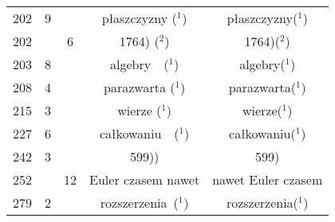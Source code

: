 \documentclass[a4paper,11pt]{article}
\numberwithin{equation}{section}
\begin{document}
\begin{center}
\begin{tabular}{|c|c|c|c|c|}
    202 & \hphantom{0}9 & & płaszczyzny ($^{ 1 }$) & płaszczyzny($^{ 1 }$) \\
    202 & & \hphantom{0}6 & 1764) ($^{ 2 }$) & 1764)($^{ 2 }$) \\
    203 & \hphantom{0}8 & & algebry~~($^{ 1 }$) & algebry($^{ 1 }$) \\
    208 & \hphantom{0}4 & & parazwarta ($^{ 1 }$) & parazwarta($^{ 1 }$) \\
    215 & \hphantom{0}3 & & wierze ($^{ 1 }$) & wierze($^{ 1 }$) \\
    227 & \hphantom{0}6 & & całkowaniu~~($^{ 1 }$) & całkowaniu($^{ 1 }$) \\
    242 & \hphantom{0}3 & & 599)) & 599) \\
    252 & & 12 & Euler czasem nawet & nawet Euler czasem \\
    279 & \hphantom{0}2 & & rozszerzenia~($^{ 1 }$)
    & rozszerzenia($^{ 1 }$) \\
    \hline
  \end{tabular}







\end{center}

\VerSpaceTwo
\end{document}
